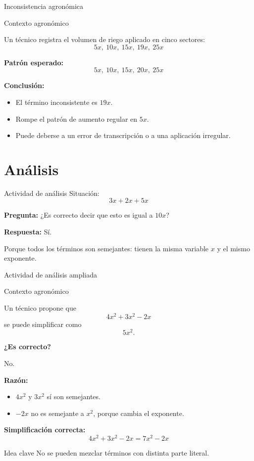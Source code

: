 \documentclass[aspectratio=169,12pt]{beamer}
\newcommand{\IdeaClave}[1]{
	\begin{alertblock}{Idea clave}
		#1
	\end{alertblock}
}
\newcommand{\Agronomia}[1]{
	\begin{exampleblock}{Contexto agronómico}
		#1
	\end{exampleblock}
}
\begin{document}
	\begin{frame}{Inconsistencia agronómica}
		\Agronomia{
			Un técnico registra el volumen de riego aplicado en cinco sectores:
			\[
			5x,\ 10x,\ 15x,\ 19x,\ 25x
			\]
		}
		
		\pause
		\textbf{Patrón esperado:}
		\[
		5x,\ 10x,\ 15x,\ 20x,\ 25x
		\]
		
		\pause
		\textbf{Conclusión:}
		\begin{itemize}
			\item El término inconsistente es \(19x\).
			\pause
			\item Rompe el patrón de aumento regular en \(5x\).
			\pause
			\item Puede deberse a un error de transcripción o a una aplicación irregular.
		\end{itemize}
	\end{frame}
	
	\section{Análisis}
	\begin{frame}{Actividad de análisis}
		Situación:
		\[
		3x+2x+5x
		\]
		
		\pause
		\textbf{Pregunta:} ¿Es correcto decir que esto es igual a \(10x\)?
		
		\pause
		\textbf{Respuesta:} Sí.
		
		\pause
		Porque todos los términos son semejantes: tienen la misma variable \(x\) y el mismo exponente.
	\end{frame}
	
	\begin{frame}{Actividad de análisis ampliada}
		\Agronomia{
			Un técnico propone que
			\[
			4x^2+3x^2-2x
			\]
			se puede simplificar como
			\[
			5x^2.
			\]
		}
		
		\pause
		\textbf{¿Es correcto?}
		
		\pause
		No.
		
		\pause
		\textbf{Razón:}
		\begin{itemize}
			\item \(4x^2\) y \(3x^2\) sí son semejantes.
			\pause
			\item \(-2x\) no es semejante a \(x^2\), porque cambia el exponente.
		\end{itemize}
		
		\pause
		\textbf{Simplificación correcta:}
		\[
		4x^2+3x^2-2x=7x^2-2x
		\]
		
		\pause
		\IdeaClave{No se pueden mezclar términos con distinta parte literal.}
	\end{frame}
	
\end{document}
